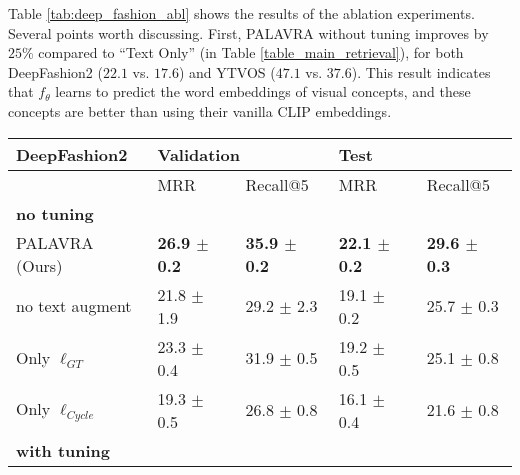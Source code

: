 \documentclass[runningheads]{llncs}
\newcommand{\ftheta}{f_\theta}
\begin{document}
Table \ref{tab:deep_fashion_abl} shows the results of the ablation experiments.
Several points worth discussing. First, PALAVRA without tuning improves by $25\%$ compared to ``Text Only'' (in Table \ref{table_main_retrieval}), for both DeepFashion2 ($22.1$ vs. $17.6$) and YTVOS ($47.1$ vs. $37.6$). This result indicates that $\ftheta$ learns to predict the word embeddings of visual concepts, and these concepts are better than using their vanilla CLIP embeddings.

\begin{table}[t]
\centering
\begin{tabular}{l|ll|ll}
    \toprule
    {DeepFashion2} &    \multicolumn{2}{l|}{Validation}       &    \multicolumn{2}{l}{Test} \\
    \toprule
    {} &       MRR &     Recall@5 &       MRR &  Recall@5 \\
    \midrule
     {\textbf{no tuning}} &&\\
PALAVRA (Ours) &  \textbf{26.9 $\pm$ 0.2} &  \textbf{35.9 $\pm$ 0.2} &  \textbf{22.1 $\pm$ 0.2} &  \textbf{29.6 $\pm$ 0.3} \\
 no text augment  &  21.8 $\pm$ 1.9 &  29.2 $\pm$ 2.3 &  19.1 $\pm$ 0.2 &  25.7 $\pm$ 0.3 \\
Only $\ell_{GT}$ &  23.3 $\pm$ 0.4 &  31.9 $\pm$ 0.5 &  19.2 $\pm$ 0.5 &  25.1 $\pm$ 0.8 \\
Only $\ell_{Cycle}$   &  19.3 $\pm$ 0.5 &  26.8 $\pm$ 0.8 &  16.1 $\pm$ 0.4 &  21.6 $\pm$ 0.8 \\
          \toprule
   {\textbf{with tuning}} &&\\


\end{tabular}
\end{table}
\end{document}
